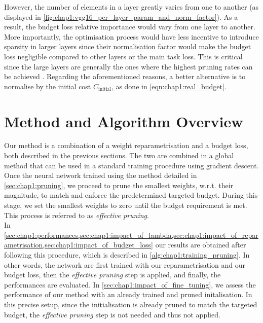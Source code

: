 However, the number of elements in a layer greatly varies from one to another
(as displayed in \cref{fig:chap1:vgg16_per_layer_param_and_norm_factor}). As a
result,  the budget loss relative importance would vary from one layer to
another. More importantly, the optimisation process would have less incentive to
introduce sparsity in larger layers since their normalisation factor would make
the budget loss negligible compared to other layers or the main task loss. This
is critical since the large layers are generally the ones where the highest
pruning rates can be achieved \cite{DBLP:journals/corr/abs-2202-12002}.
Regarding the aforementioned reasons, a better alternative is to normalise by
the initial cost $C_\text{initial}$, as done in \cref{eqn:chap1:real_budget}.\\


\section{Method and Algorithm Overview}
\label{sec:chap1:overview}
Our method is a combination of a weight reparametrisation and a budget loss,
both described in the previous sections. The two are combined in a global method
that can be used in a standard training procedure using gradient descent. Once
the neural network trained using the method detailed in
\cref{sec:chap1:pruning}, we proceed to prune the smallest weights, w.r.t. their
magnitude, to match and enforce the predetermined targeted budget. During this
stage, we set the smallest weights to zero until the budget requirement is met.
This process is referred to as \textit{effective pruning}.\\

In
\cref{sec:chap1:performances,sec:chap1:impact_of_lambda,sec:chap1:impact_of_reparametrisation,sec:chap1:impact_of_budget_loss}
our results are obtained after following this procedure, which is described in
\cref{alg:chap1:training_pruning}. In other words, the network are first trained
with our reparametrisation and our budget loss, then the \textit{effective
pruning} step is applied, and finally, the performances are evaluated. In
\cref{sec:chap1:impact_of_fine_tuning}, we assess the performance of our method
with an already trained and pruned initalisation. In this precise setup, since
the initialisation is already pruned to match the targeted budget, the
\emph{effective pruning} step is not needed and thus not applied.\\

